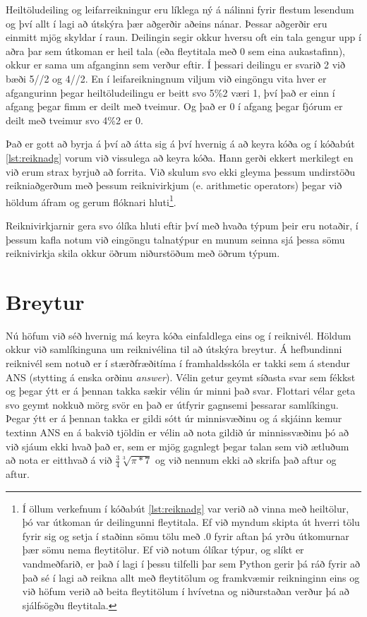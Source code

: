 \begin{valBox}
	Heiltöludeiling og leifarreikningur eru líklega ný á nálinni fyrir flestum lesendum og því allt í lagi að útskýra þær aðgerðir aðeins nánar.
	Þessar aðgerðir eru einmitt mjög skyldar í raun.
	Deilingin segir okkur hversu oft ein tala gengur upp í aðra þar sem útkoman er heil tala (eða fleytitala með 0 sem eina aukastafinn), okkur er sama um afganginn sem verður eftir.
	Í þessari deilingu er svarið 2 við bæði 5//2 og 4//2.
	En í leifareikningnum viljum við eingöngu vita hver er afgangurinn þegar heiltöludeilingu er beitt svo 5\%2 væri 1, því það er einn í afgang þegar fimm er deilt með tveimur.
	Og það er 0 í afgang þegar fjórum er deilt með tveimur svo 4\%2 er 0.
\end{valBox}

Það er gott að byrja á því að átta sig á því hvernig á að keyra kóða og í kóðabút \ref{lst:reiknadg} vorum við vissulega að keyra kóða.
Hann gerði ekkert merkilegt en við erum strax byrjuð að forrita.
Við skulum svo ekki gleyma þessum undirstöðu reikniaðgerðum með þessum reiknivirkjum (e. arithmetic operators) þegar við höldum áfram og gerum flóknari hluti\footnote{
	Í öllum verkefnum í kóðabút \ref{lst:reiknadg} var verið að vinna með heiltölur, þó var útkoman úr deilingunni fleytitala. 
	Ef við myndum skipta út hverri tölu fyrir sig og setja í staðinn sömu tölu með .0 fyrir aftan þá yrðu útkomurnar þær sömu nema fleytitölur. 
	Ef við notum ólíkar týpur, og slíkt er vandmeðfarið, er það í lagi í þessu tilfelli þar sem Python gerir þá ráð fyrir að það sé í lagi að reikna allt með fleytitölum og framkvæmir reikninginn eins og við höfum verið að beita fleytitölum í hvívetna og niðurstaðan verður þá að sjálfsögðu fleytitala.
}.

Reiknivirkjarnir gera svo ólíka hluti eftir því með hvaða týpum þeir eru notaðir, í þessum kafla notum við eingöngu talnatýpur en munum seinna sjá þessa sömu reiknivirkja skila okkur öðrum niðurstöðum með öðrum týpum.

\section{Breytur}
Nú höfum við séð hvernig má keyra kóða einfaldlega eins og í reiknivél.
Höldum okkur við samlíkinguna um reiknivélina til að útskýra breytur.
Á hefbundinni reiknivél sem notuð er í stærðfræðitíma í framhaldsskóla er takki sem á stendur ANS (stytting á enska orðinu \textit{answer}).
Vélin getur geymt síðasta svar sem fékkst og þegar ýtt er á þennan takka sækir vélin úr minni það svar.
Flottari vélar geta svo geymt nokkuð mörg svör en það er útfyrir gagnsemi þessarar samlíkingu.
Þegar ýtt er á þennan takka er gildi sótt úr minnisvæðinu og á skjáinn kemur textinn ANS en á bakvið tjöldin er vélin að nota gildið úr minnissvæðinu þó að við sjáum ekki hvað það er, sem er mjög gagnlegt þegar talan sem við ætluðum að nota er eitthvað á við $\frac{3}{4}\sqrt[3]{\pi*7} $ og við nennum ekki að skrifa það aftur og aftur.

